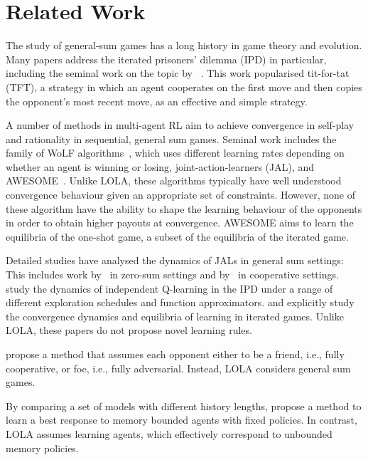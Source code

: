 \section{Related Work}
\label{sec:related_work}
The study of general-sum games has a long history in game theory and evolution. Many papers address the iterated prisoners' dilemma (IPD) in particular, including the seminal work on the topic by ~\citet{axelrod2006evolution}. This work popularised tit-for-tat (TFT), a strategy in which an agent cooperates on the first move and then copies the opponent's most recent move, as an effective and simple strategy. 

A  number of methods in  multi-agent RL aim to achieve convergence in self-play and rationality in sequential, general sum games. Seminal work includes the family of WoLF algorithms~\citep{bowling2002multiagent}, which uses different learning rates depending on whether an agent is winning or losing, joint-action-learners (JAL), and AWESOME~\citep{conitzer2007awesome}. 
Unlike LOLA, these algorithms typically have well understood convergence behaviour given an appropriate set of constraints.
However, none  of these algorithm have the ability to shape the learning behaviour of the opponents in order to obtain higher payouts at convergence. AWESOME aims to learn the equilibria of the one-shot game, a subset of the equilibria of the iterated game.


Detailed studies have analysed the dynamics of JALs in general sum settings: This includes work by~\citet{uther1997adversarial} in zero-sum settings and 
by~\citet{claus1998dynamics} in cooperative settings.
\citet{sandholm1996multiagent} study the dynamics of independent Q-learning in the IPD under a range of different exploration schedules and function approximators.
\citet{wunder2010classes} and \citet{zinkevich2006cyclic}  explicitly study the convergence dynamics and equilibria of learning in iterated games. Unlike LOLA, these papers do not propose novel learning rules.

\citet{littman2001friend} propose a method that assumes each opponent either to be a friend, i.e., fully cooperative, or foe, i.e., fully adversarial. Instead, LOLA considers general sum games.


 By comparing a set of models with different history lengths, \citet{chakraborty2014multiagent} propose a method to learn a best response to memory bounded agents with fixed policies. In contrast, LOLA assumes learning agents, which effectively correspond to unbounded memory policies.


